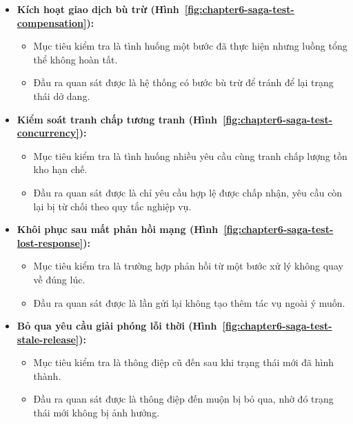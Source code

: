 \begin{itemize}
  \item \textbf{Kích hoạt giao dịch bù trừ (Hình~\ref{fig:chapter6-saga-test-compensation}):} 
    \begin{itemize}
      \item Mục tiêu kiểm tra là tình huống một bước đã thực hiện nhưng luồng tổng thể không hoàn tất.
      \item Đầu ra quan sát được là hệ thống có bước bù trừ để tránh để lại trạng thái dở dang.
    \end{itemize}

  \item \textbf{Kiểm soát tranh chấp tương tranh (Hình~\ref{fig:chapter6-saga-test-concurrency}):}
    \begin{itemize}
      \item Mục tiêu kiểm tra là tình huống nhiều yêu cầu cùng tranh chấp lượng tồn kho hạn chế.
      \item Đầu ra quan sát được là chỉ yêu cầu hợp lệ được chấp nhận, yêu cầu còn lại bị từ chối theo quy tắc nghiệp vụ.
    \end{itemize}

  \item \textbf{Khôi phục sau mất phản hồi mạng (Hình~\ref{fig:chapter6-saga-test-lost-response}):}
    \begin{itemize}
      \item Mục tiêu kiểm tra là trường hợp phản hồi từ một bước xử lý không quay về đúng lúc.
      \item Đầu ra quan sát được là lần gửi lại không tạo thêm tác vụ ngoài ý muốn.
    \end{itemize}

  \item \textbf{Bỏ qua yêu cầu giải phóng lỗi thời (Hình~\ref{fig:chapter6-saga-test-stale-release}):}
    \begin{itemize}
      \item Mục tiêu kiểm tra là thông điệp cũ đến sau khi trạng thái mới đã hình thành.
      \item Đầu ra quan sát được là thông điệp đến muộn bị bỏ qua, nhờ đó trạng thái mới không bị ảnh hưởng.
    \end{itemize}
\end{itemize}

